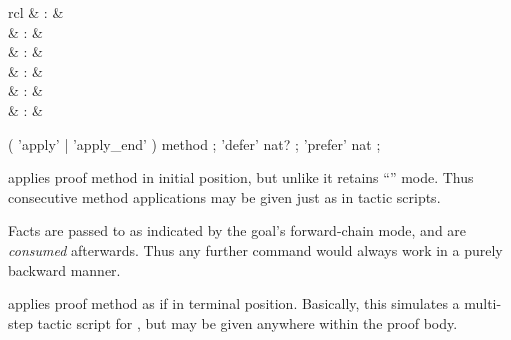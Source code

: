 \begin{isabellebody}
\begin{isamarkuptext}
  \begin{matharray}{rcl}
    \mbox{}\isa{{\isachardoublequote}\isactrlsup {\isacharasterisk}{\isachardoublequote}} & : &  \\
    \mbox{}\isa{{\isachardoublequote}\isactrlsup {\isacharasterisk}{\isachardoublequote}} & : &  \\
    \mbox{}\isa{{\isachardoublequote}\isactrlsup {\isacharasterisk}{\isachardoublequote}} & : &  \\
    \mbox{}\isa{{\isachardoublequote}\isactrlsup {\isacharasterisk}{\isachardoublequote}} & : &  \\
    \mbox{}\isa{{\isachardoublequote}\isactrlsup {\isacharasterisk}{\isachardoublequote}} & : &  \\
    \mbox{}\isa{{\isachardoublequote}\isactrlsup {\isacharasterisk}{\isachardoublequote}} & : &  \\
  \end{matharray}

  \begin{rail}
    ( 'apply' | 'apply\_end' ) method
    ;
    'defer' nat?
    ;
    'prefer' nat
    ;
  \end{rail}

  \begin{descr}

  \item [\mbox{\isa{\isacommand{apply}}}~\isa{m}] applies proof method 
  in initial position, but unlike \mbox{} it retains
  ``'' mode.  Thus consecutive method
  applications may be given just as in tactic scripts.
  
  Facts are passed to  as indicated by the goal's
  forward-chain mode, and are \emph{consumed} afterwards.  Thus any
  further \mbox{} command would always work in a purely
  backward manner.
  
  \item [\mbox{\isa{\isacommand{apply{\isacharunderscore}end}}}~\isa{{\isachardoublequote}m{\isachardoublequote}}] applies proof method
   as if in terminal position.  Basically, this simulates a
  multi-step tactic script for \mbox{}, but may be given
  anywhere within the proof body.
  

\end{descr}
\end{isamarkuptext}
\end{isabellebody}

